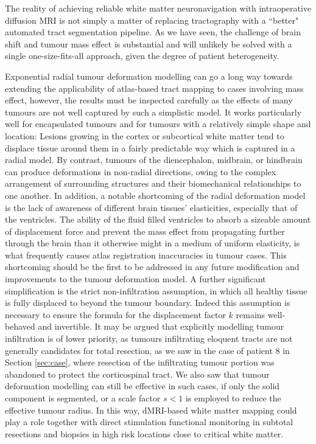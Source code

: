 The reality of achieving reliable white matter neuronavigation with intraoperative diffusion MRI is not simply a matter of replacing tractography with a ``better" automated tract segmentation pipeline.
As we have seen, the challenge of brain shift and tumour mass effect is substantial and will unlikely be solved with a single one-size-fits-all approach, given the degree of patient heterogeneity.

Exponential radial tumour deformation modelling can go a long way towards extending the applicability of atlas-based tract mapping to cases involving mass effect, however, the results must be inspected carefully as the effects of many tumours are not well captured by such a simplistic model.
It works particularly well for encapsulated tumours and for tumours with a relatively simple shape and location:
Lesions growing in the cortex or subcortical white matter tend to displace tissue around them in a fairly predictable way which is captured in a radial model.
By contrast, tumours of the diencephalon, midbrain, or hindbrain can produce deformations in non-radial directions, owing to the complex arrangement of surrounding structures and their biomechanical relationships to one another.
In addition, a notable shortcoming of the radial deformation model is the lack of awareness of different brain tissues' elasticities, especially that of the ventricles.
The ability of the fluid filled ventricles to absorb a sizeable amount of displacement force and prevent the mass effect from propagating further through the brain than it otherwise might in a medium of uniform elasticity, is what frequently causes atlas registration inaccuracies in tumour cases.
This shortcoming should be the first to be addressed in any future modification and improvements to the tumour deformation model.
A further significant simplification is the strict non-infiltration assumption, in which all healthy tissue is fully displaced to beyond the tumour boundary.
Indeed this assumption is necessary to ensure the formula for the displacement factor $k$ remains well-behaved and invertible.
It may be argued that explicitly modelling tumour infiltration is of lower priority, as tumours infiltrating eloquent tracts are not generally candidates for total resection, as we saw in the case of patient 8 in Section \ref{sec:case}, where resection of the infiltrating tumour portion was abandoned to protect the corticospinal tract.
We also saw that tumour deformation modelling can still be effective in such cases, if only the solid component is segmented, or a scale factor $s<1$ is employed to reduce the effective tumour radius.
In this way, dMRI-based white matter mapping could play a role together with direct stimulation functional monitoring in subtotal resections and biopsies in high risk locations close to critical white matter.

